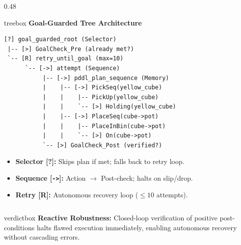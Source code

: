 \documentclass[10pt]{beamer}
\begin{document}
\begin{frame}[fragile,t]
\begin{columns}[T]
    \begin{column}{0.48\textwidth}
        \begin{beamercolorbox}[sep=5pt,rounded=true,shadow=true]{treebox}
            \scriptsize \textbf{Goal-Guarded Tree Architecture}
                \fontsize{4.4pt}{5.1pt}\selectfont
\begin{verbatim}
[?] goal_guarded_root (Selector)
 |-- [>] GoalCheck_Pre (already met?)
 `-- [R] retry_until_goal (max=10)
      `-- [->] attempt (Sequence)
           |-- [->] pddl_plan_sequence (Memory)
           |    |-- [->] PickSeq(yellow_cube)
           |    |    |-- PickUp(yellow_cube)
           |    |    `-- [>] Holding(yellow_cube)
           |    |-- [->] PlaceSeq(cube->pot)
           |    |    |-- PlaceInBin(cube->pot)
           |    |    `-- [>] On(cube->pot)
           `-- [>] GoalCheck_Post (verified?)
\end{verbatim}
            \end{beamercolorbox}
            \vspace{-0.10cm}
            \begin{itemize}\scriptsize
                \setlength\itemsep{0.02em}
                \item \textbf{Selector [?]:} Skips plan if met; falls back to retry loop.
                \item \textbf{Sequence [\texttt{->}]:} Action $\to$ Post-check; halts on slip/drop.
                \item \textbf{Retry [R]:} Autonomous recovery loop ($\le 10$ attempts).
            \end{itemize}
    \end{column}
\end{columns}

\vspace{0.12cm}
\begin{beamercolorbox}[sep=2.2pt,center,rounded=true]{verdictbox}
    \tiny \textbf{Reactive Robustness:} Closed-loop verification of positive post-conditions halts flawed execution immediately, enabling autonomous recovery without cascading errors.
\end{beamercolorbox}
\end{frame}
\end{document}

